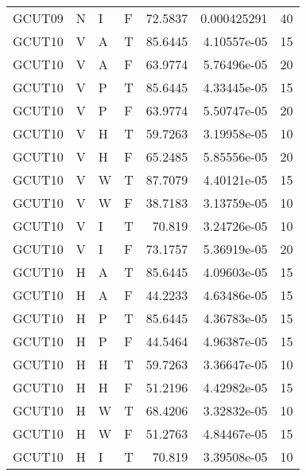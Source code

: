 \begin{longtable}{llllrrr}
    GCUT09   & N         & I         & F          & 72.5837    & 0.000425291 & 40       \\
    GCUT10   & V         & A         & T          & 85.6445    & 4.10557e-05 & 15       \\
    GCUT10   & V         & A         & F          & 63.9774    & 5.76496e-05 & 20       \\
    GCUT10   & V         & P         & T          & 85.6445    & 4.33445e-05 & 15       \\
    GCUT10   & V         & P         & F          & 63.9774    & 5.50747e-05 & 20       \\
    GCUT10   & V         & H         & T          & 59.7263    & 3.19958e-05 & 10       \\
    GCUT10   & V         & H         & F          & 65.2485    & 5.85556e-05 & 20       \\
    GCUT10   & V         & W         & T          & 87.7079    & 4.40121e-05 & 15       \\
    GCUT10   & V         & W         & F          & 38.7183    & 3.13759e-05 & 10       \\
    GCUT10   & V         & I         & T          & 70.819     & 3.24726e-05 & 10       \\
    GCUT10   & V         & I         & F          & 73.1757    & 5.36919e-05 & 20       \\
    GCUT10   & H         & A         & T          & 85.6445    & 4.09603e-05 & 15       \\
    GCUT10   & H         & A         & F          & 44.2233    & 4.63486e-05 & 15       \\
    GCUT10   & H         & P         & T          & 85.6445    & 4.36783e-05 & 15       \\
    GCUT10   & H         & P         & F          & 44.5464    & 4.96387e-05 & 15       \\
    GCUT10   & H         & H         & T          & 59.7263    & 3.36647e-05 & 10       \\
    GCUT10   & H         & H         & F          & 51.2196    & 4.42982e-05 & 15       \\
    GCUT10   & H         & W         & T          & 68.4206    & 3.32832e-05 & 10       \\
    GCUT10   & H         & W         & F          & 51.2763    & 4.84467e-05 & 15       \\
    GCUT10   & H         & I         & T          & 70.819     & 3.39508e-05 & 10       \\

\end{longtable}
